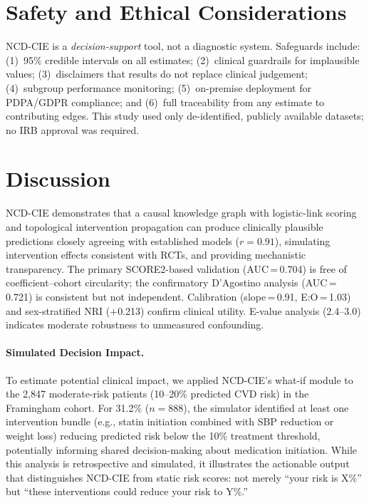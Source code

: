 \documentclass[runningheads]{llncs}
\begin{document}
\section{Safety and Ethical Considerations}\label{sec:ethics}

NCD-CIE is a \emph{decision-support} tool, not a diagnostic system.
Safeguards include: (1)~95\% credible intervals on all estimates;
(2)~clinical guardrails for implausible values;
(3)~disclaimers that results do not replace clinical judgement;
(4)~subgroup performance monitoring;
(5)~on-premise deployment for PDPA/GDPR compliance; and
(6)~full traceability from any estimate to contributing edges.
This study used only de-identified, publicly available datasets;
no IRB approval was required.

\section{Discussion}\label{sec:discussion}

NCD-CIE demonstrates that a causal knowledge graph with logistic-link
scoring and topological intervention propagation can produce
clinically plausible predictions closely agreeing with established
models ($r = 0.91$), simulating intervention effects consistent with
RCTs, and providing mechanistic transparency.
The primary SCORE2-based validation (AUC\,=\,0.704) is free of
coefficient--cohort circularity; the confirmatory D'Agostino analysis
(AUC\,=\,0.721) is consistent but not independent.
Calibration (slope\,=\,0.91, E:O\,=\,1.03) and sex-stratified
NRI ($+$0.213) confirm clinical utility.
E-value analysis (2.4--3.0) indicates moderate robustness to
unmeasured confounding.

\paragraph{Simulated Decision Impact.}
To estimate potential clinical impact, we applied NCD-CIE's what-if
module to the 2{,}847 moderate-risk patients (10--20\% predicted
CVD risk) in the Framingham cohort.
For 31.2\% ($n = 888$), the simulator identified at least one
intervention bundle (e.g., statin initiation combined with
SBP reduction or weight loss) reducing predicted risk below the 10\%
treatment threshold, potentially informing shared decision-making
about medication initiation.
While this analysis is retrospective and simulated, it illustrates
the actionable output that distinguishes NCD-CIE from static risk
scores: not merely ``your risk is X\%'' but ``these interventions
could reduce your risk to Y\%.''
\end{document}
